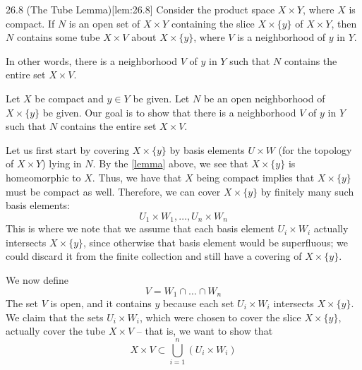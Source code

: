 \begin{thmBox}[Lemma]{26.8 (The Tube Lemma)}[lem:26.8]
    Consider the product space \( X \times Y \), where \( X \) is compact.
    If \( N \) is an open set of \( X \times Y \) containing the slice 
    \( X \times \{ y \} \) of \( X \times Y \), then \( N \) contains some 
    tube \( X \times V \) about \( X \times \{ y \} \), where \( V \) is a 
    neighborhood of \( y \) in \( Y \).

    \baseSkip

    In other words, there is a neighborhood \( V \) of \( y \) in \( Y \)
    such that \( N \) contains the entire set \( X \times V \).

    \baseRule

    \begin{proofBox}
        Let \( X \) be compact and \( y \in Y \) be given.
        Let \( N \) be an open neighborhood of \( X \times \{ y \} \) be given.
        Our goal is to show that there is a neighborhood \( V \) of \( y \) in
        \( Y \) such that \( N \) contains the entire set \( X \times V \).

        \baseSkip 

        Let us first start by covering \( X \times \{ y \} \) by basis elements 
        \( U \times W \) (for the topology of \( X \times Y \)) lying in 
        \( N \).
        By the [\hyperlink{lem:26.8.1}{lemma}] above, we see that 
        \( X \times \{ y \} \) is homeomorphic to \( X \).
        Thus, we have that \( X \) being compact implies that 
        \( X \times \{ y \} \) must be compact as well.
        Therefore, we can cover \( X \times \{ y \} \) by finitely many such
        basis elements:
        \begin{equation*}
            U_{ 1 } \times W_{ 1 }
            , \ldots , 
            U_{ n } \times W_{ n }
        \end{equation*}
        This is where we note that we assume that each basis element
        \( U_{ i } \times W_{ i } \) actually intersects 
        \( X \times \{ y \} \), since
        otherwise that basis element would be superfluous; we could discard it 
        from the finite collection and still have a covering of 
        \( X \times \{ y \} \).

        \baseSkip

        We now define 
        \begin{equation*}
            V 
            =
            W_{ 1 } \cap \ldots \cap W_{ n }
        \end{equation*}
        The set \( V \) is open, and it contains \( y \) because each set
        \( U_{ i } \times W_{ i } \) intersects \( X \times \{ y \} \).
        We claim that the sets \( U_{ i } \times W_{ i } \), which were
        chosen to cover the slice \( X \times \{ y \} \), actually cover
        the tube \( X \times V \) -- that is, we want to show that 
        \begin{equation*}
            X \times V \subset \bigcup_{ i = 1 }^{ n } 
            ( U_{ i } \times W_{ i } )
        \end{equation*}


\end{proofBox}
\end{thmBox}
